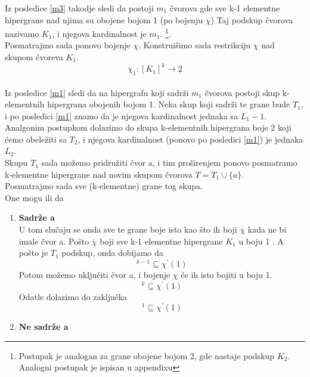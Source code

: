 \documentclass[a4paper]{article}
\begin{document}
\begin{description}
		Iz posledice \ref{m3} takodje sledi da postoji $m_1$ čvorova gde sve k-1 elementne hipergrane nad njima su obojene bojom 1 (po bojenju $\overline{\chi}$)
		Taj podskup čvorova nazivamo $K_1$, i njegova kardinalnost je  $m_1$. \footnote{Postupak je analogan za grane obojene bojom 2, gde nastaje podskup $K_2$. Analogni postupak je ispisan u appendixu}. \\
		Posmatrajmo sada ponovo bojenje $\chi$. Konstruišimo sada restrikciju $\chi$ nad  skupom čvoreva $K_1$.
		\begin{equation}
			\chi_1 : [ K_1 ]^k  \rightarrow \underline{2}
		\end{equation}\\
		Iz posledice \ref{m1} sledi da na hipergrafu koji sadrži $m_1$ čvorova postoji skup k-elementnih hipergrana obojenih bojom 1. Neka skup koji sadrži te grane bude $T_1$, i po posledici \ref{m1} znamo da je njegova kardinalnost jednaka sa $L_1 - 1$. Analgonim postupkom dolazimo do  skupa k-elementnih hipergrana boje 2 koji ćemo obeležiti sa $T_2$, i njegova kardinalnost (ponovo po posledici \ref{m1}) je jednaka $L_2$. \\
		Skupu $T_1$ sada možemo pridružiti čvor a, i tim proširenjem ponovo posmatramo k-elementne hipergrane nad novim skupom čvorova $T = T_1 \cup \{a\}$.\\
		Posmatrajmo sada sve (k-elementne) grane tog skupa.\\
		One mogu ili da 
		\begin{enumerate}
			\item \textbf{Sadrže a}\\
				U tom slučaju se onda sve te grane boje isto kao što ih boji $\overline{\chi}$ kada ne bi imale čvor a. Pošto $\overline{\chi}$ boji sve k-1 elementne hipergrane $K_1$ u boju 1 . A pošto je $T_1$ podskup, onda dobijamo da 
				\begin{equation}
					[ T_1 ]^{k-1} \subseteq \chi^\prime (1)
				\end{equation}
				Potom možemo uključiti čvor a, i bojenje $\chi$ će ih isto bojiti u boju 1.
				\begin{equation}
					[ T_1 \cup \{a\} ]^{k} \subseteq \chi^\prime (1)
				\end{equation}
				Odatle dolazimo do zaključka 
				\begin{equation}
					[ T ]^{1} \subseteq \chi^\prime (1)
				\end{equation}
			\item  \textbf{Ne sadrže a} \\

\end{enumerate}
\end{description}
\end{document}
